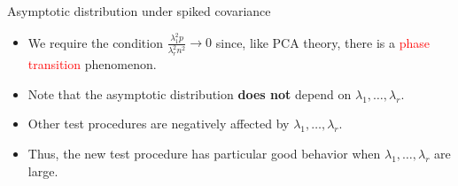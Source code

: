 \documentclass{beamer}
\DeclareMathOperator{\mytr}{tr}
\theoremstyle{plain}
\theoremstyle{definition}
\theoremstyle{remark}
\begin{document}
\begin{frame}{Asymptotic distribution under spiked covariance}
    \begin{itemize}
        \item
            We require the condition $\frac{\lambda_1^2 p}{\lambda_r^2 n^2}\to 0$
             since, like PCA theory, there is a \textcolor{red}{phase transition} phenomenon.
        \item
            Note that the asymptotic distribution \textbf{does not} depend on $\lambda_1,\ldots,\lambda_r$.
        \item
            Other test procedures are negatively affected by $\lambda_1,\ldots,\lambda_r$.
         \item
             Thus, the new test procedure has particular good behavior when $\lambda_1,\ldots,\lambda_r$ are large.
    \end{itemize}
\end{frame}
\end{document}
